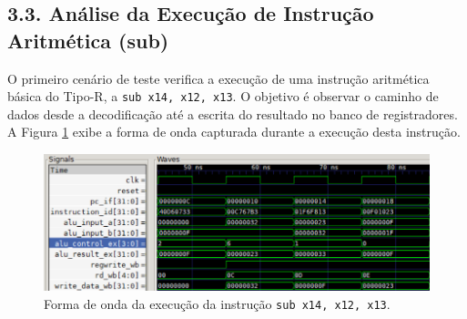 \documentclass[12pt, a4paper]{article}
\begin{document}
\subsection*{3.3. Análise da Execução de Instrução Aritmética (sub)}

O primeiro cenário de teste verifica a execução de uma instrução aritmética básica do Tipo-R, a \texttt{sub x14, x12, x13}. O objetivo é observar o caminho de dados desde a decodificação até a escrita do resultado no banco de registradores. A Figura \ref{fig:gtk_sub} exibe a forma de onda capturada durante a execução desta instrução.

\begin{figure}[H]
    \centering
    \includegraphics[width=1\textwidth]{Cenário 1.png}
    \caption{Forma de onda da execução da instrução \texttt{sub x14, x12, x13}.}
    \label{fig:gtk_sub}
\end{figure}
\end{document}
